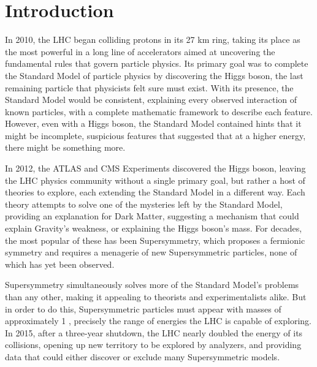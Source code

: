 
\chapter{Introduction} %

\label{ch:introduction} %


In 2010, the \ac{LHC} began colliding protons in its 27 km ring, taking its place as the most powerful in a long line of accelerators aimed at uncovering the fundamental rules that govern particle physics. Its primary goal was to complete the Standard Model of particle physics by discovering the Higgs boson, the last remaining particle that physicists felt sure must exist. With its presence, the Standard Model would be consistent, explaining every observed interaction of known particles, with a complete mathematic framework to describe each feature. However, even with a Higgs boson, the Standard Model contained hints that it might be incomplete, suspicious features that suggested that at a higher energy, there might be something more.

In 2012, the ATLAS and \ac{CMS} Experiments discovered the Higgs boson, leaving the \ac{LHC} physics community without a single primary goal, but rather a host of theories to explore, each extending the Standard Model in a different way. Each theory attempts to solve one of the mysteries left by the Standard Model, providing an explanation for Dark Matter, suggesting a mechanism that could explain Gravity's weakness, or explaining the Higgs boson's mass. For decades, the most popular of these has been Supersymmetry, which proposes a fermionic symmetry and requires a menagerie of new Supersymmetric particles, none of which has yet been observed. 

Supersymmetry simultaneously solves more of the Standard Model's problems than any other, making it appealing to theorists and experimentalists alike. But in order to do this, Supersymmetric particles must appear with masses of approximately 1 \tev, precisely the range of energies the \ac{LHC} is capable of exploring. In 2015, after a three-year shutdown, the \ac{LHC} nearly doubled the energy of its collisions, opening up new territory to be explored by analyzers, and providing data that could either discover or exclude many Supersymmetric models.

